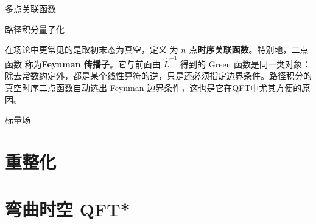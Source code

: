 多点关联函数

路径积分量子化

在场论中更常见的是取初末态为真空，定义
为 $n$ 点\textbf{时序关联函数}。特别地，二点函数
称为\textbf{Feynman 传播子}。它与前面由 $\hat L^{-1}$ 得到的 Green 函数是同一类对象：除去常数约定外，都是某个线性算符的逆，只是还必须指定边界条件。路径积分的真空时序二点函数自动选出 Feynman 边界条件，这也是它在QFT中尤其方便的原因。

标量场

\section{重整化}

\section{弯曲时空 QFT*}